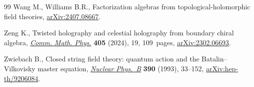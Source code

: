 \begin{thebibliography}{99}
Wang M., Williams B.R., Factorization algebras from topological-holomorphic
 field theories, \href{http://arxiv.org/abs/2407.08667}{arXiv:2407.08667}.

Zeng K., Twisted holography and celestial holography from boundary chiral
 algebra, \href{https://doi.org/10.1007/s00220-023-04917-0}{\textit{Comm.
 Math. Phys.}} \textbf{405} (2024), 19, 109~pages,
 \href{http://arxiv.org/abs/2302.06693}{arXiv:2302.06693}.

Zwiebach B., Closed string field theory: quantum action and the
 {B}atalin--{V}ilkovisky master equation,
 \href{https://doi.org/10.1016/0550-3213(93)90388-6}{\textit{Nuclear Phys.~B}}
 \textbf{390} (1993), 33--152,
 \href{http://arxiv.org/abs/hep-th/9206084}{arXiv:hep-th/9206084}.

\end{thebibliography}
